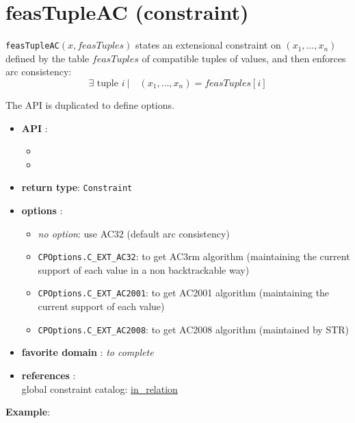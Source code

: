 \label{feastupleac}
\hypertarget{feastupleac}{}

\section{feasTupleAC (constraint)}\label{feastupleac:feastupleacconstraint}\hypertarget{feastupleac:feastupleacconstraint}{}
\begin{notedef}
  \texttt{feasTupleAC}$(x,feasTuples)$ states an extensional constraint on $(x_1,\ldots,x_n)$ defined by the table $feasTuples$ of compatible tuples of values, and then enforces arc consistency:
      $$\exists \text{ tuple } i\ |\quad (x_1,\ldots,x_n)=feasTuples[i]$$
\end{notedef}

The API is duplicated to define options.
\begin{itemize}
	\item \textbf{API} :
	\begin{itemize}
		\item {}
		\item {}
	\end{itemize}
	\item \textbf{return type}: \texttt{Constraint}
	\item \textbf{options} :
	\begin{itemize}
		\item \emph{no option}: use AC32 (default arc consistency)
		\item \texttt{CPOptions.C_EXT_AC32}: to get AC3rm algorithm (maintaining the current support of each value in a non backtrackable way)
		\item \texttt{CPOptions.C_EXT_AC2001}: to get AC2001 algorithm (maintaining the current support of each value)
		\item \texttt{CPOptions.C_EXT_AC2008}: to get AC2008 algorithm (maintained by STR)
	\end{itemize}
	\item \textbf{favorite domain} : \emph{to complete}
	\item \textbf{references} :\\
      global constraint catalog: \href{http://www.emn.fr/x-info/sdemasse/gccat/Cin_relation.html}{in\_relation}
\end{itemize}

\textbf{Example}:

